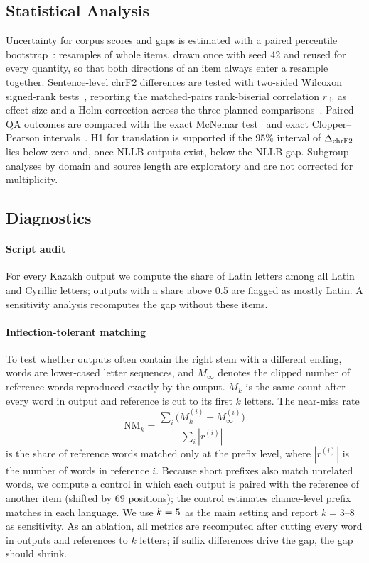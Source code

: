\subsection{Statistical Analysis}
Uncertainty for corpus scores and gaps is estimated with a paired percentile bootstrap~\cite{koehn2004significance}: \NBoot{} resamples of whole items, drawn once with seed 42 and reused for every quantity, so that both directions of an item always enter a resample together. Sentence-level chrF2 differences are tested with two-sided Wilcoxon signed-rank tests~\cite{wilcoxon1945}, reporting the matched-pairs rank-biserial correlation $r_{\mathrm{rb}}$ as effect size and a Holm correction across the three planned comparisons~\cite{holm1979}. Paired QA outcomes are compared with the exact McNemar test~\cite{mcnemar1947} and exact Clopper--Pearson intervals~\cite{clopper1934}. H1 for translation is supported if the 95\% interval of $\Delta_{\mathrm{chrF2}}$ lies below zero and, once NLLB outputs exist, below the NLLB gap. Subgroup analyses by domain and source length are exploratory and are not corrected for multiplicity.

\subsection{Diagnostics}
\paragraph*{Script audit} For every Kazakh output we compute the share of Latin letters among all Latin and Cyrillic letters; outputs with a share above 0.5 are flagged as mostly Latin. A sensitivity analysis recomputes the gap without these items.

\paragraph*{Inflection-tolerant matching} To test whether outputs often contain the right stem with a different ending, words are lower-cased letter sequences, and $M_\infty$ denotes the clipped number of reference words reproduced exactly by the output. $M_k$ is the same count after every word in output and reference is cut to its first $k$ letters. The near-miss rate
\begin{equation}
\mathrm{NM}_k = \frac{\sum_i \bigl(M_k^{(i)} - M_\infty^{(i)}\bigr)}{\sum_i |r^{(i)}|}
\label{eq:nm}
\end{equation}
is the share of reference words matched only at the prefix level, where $|r^{(i)}|$ is the number of words in reference $i$. Because short prefixes also match unrelated words, we compute a control in which each output is paired with the reference of another item (shifted by 69 positions); the control estimates chance-level prefix matches in each language. We use $k=5$ as the main setting and report $k=3$--8 as sensitivity. As an ablation, all metrics are recomputed after cutting every word in outputs and references to $k$ letters; if suffix differences drive the gap, the gap should shrink.

